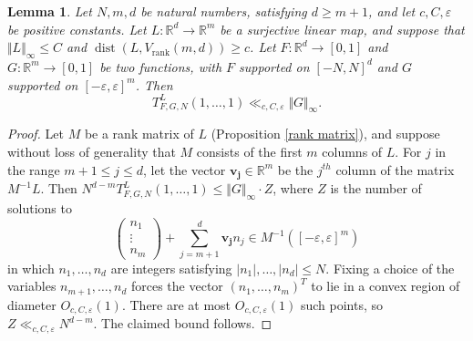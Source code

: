 \documentclass[12pt,a4paper,twoside,reqno]{amsart}
\newtheorem{Lemma}[Theorem]{Lemma}
\newcommand{\rank}{\operatorname{rank}}
\newcommand{\dist}{\operatorname{dist}}
\numberwithin{equation}{section}
\begin{document}
\begin{Lemma}
\label{Lemma crude bound on number of solutions}
Let $N,m,d$ be natural numbers, satisfying $d\geqslant m+1$, and let $c,C,\varepsilon$ be positive constants. Let $L:\mathbb{R}^d \longrightarrow \mathbb{R}^m$ be a  surjective linear map, and suppose that $\Vert L \Vert_\infty \leqslant C$ and $\dist (L,V_{\rank}(m,d)) \geqslant c$. Let $F:\mathbb{R}^d \longrightarrow [0,1]$ and $G:\mathbb{R}^m\longrightarrow [0,1]$ be two functions, with $F$ supported on $[-N,N]^d$ and $G$ supported on $[-\varepsilon,\varepsilon]^m$. Then \[ T_{F,G,N}^L(1,\dots,1) \ll_{c,C,\varepsilon} \Vert G \Vert_\infty.\] 
\end{Lemma}
\begin{proof}
Let $M$ be a rank matrix of $L$ (Proposition \ref{rank matrix}), and suppose without loss of generality that $M$ consists of the first $m$ columns of $L$. For $j$ in the range $m+1\leqslant j\leqslant d$, let the vector $\mathbf{v_{j}} \in\mathbb{R}^m$ be the $j^{th}$ column of the matrix $M^{-1} L$. Then $N^{d-m} T_{F,G,N}^L(1,\dots,1) \leqslant \Vert G\Vert_\infty \cdot Z$, where $Z$ is the number of solutions to $$ \left(\begin{matrix} n_1 \\ \vdots\\ n_m \end{matrix}\right) + \sum\limits_{j=m+1}^{d}\mathbf{v_j}n_j \in M^{-1}([-\varepsilon,\varepsilon]^m)$$ in which $n_1,\dots,n_d$ are integers satisfying $\vert n_1\vert,\dots,\vert n_d\vert \leqslant N$. Fixing a choice of the variables $n_{m+1},\dots,n_d$ forces the vector $(n_1,\dots,n_m)^T$ to lie in a convex region of diameter $O_{c,C,\varepsilon}(1)$. There are at most $O_{c,C,\varepsilon}(1)$ such points, so $Z \ll_{c,C,\varepsilon} N^{d-m}$. The claimed bound follows.
\end{proof}
\end{document}

